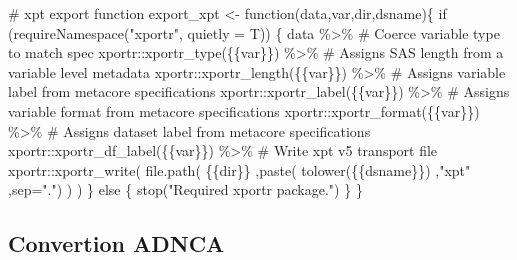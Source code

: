 \documentclass[
  letterpaper,
  DIV=11,
  numbers=noendperiod]{scrreprt}
\newenvironment{Shaded}{\begin{snugshade}}{\end{snugshade}}
\newcommand{\AttributeTok}[1]{\textcolor[rgb]{0.40,0.45,0.13}{#1}}
\newcommand{\CommentTok}[1]{\textcolor[rgb]{0.37,0.37,0.37}{#1}}
\newcommand{\ControlFlowTok}[1]{\textcolor[rgb]{0.00,0.23,0.31}{#1}}
\newcommand{\FunctionTok}[1]{\textcolor[rgb]{0.28,0.35,0.67}{#1}}
\newcommand{\NormalTok}[1]{\textcolor[rgb]{0.00,0.23,0.31}{#1}}
\newcommand{\OtherTok}[1]{\textcolor[rgb]{0.00,0.23,0.31}{#1}}
\newcommand{\SpecialCharTok}[1]{\textcolor[rgb]{0.37,0.37,0.37}{#1}}
\newcommand{\StringTok}[1]{\textcolor[rgb]{0.13,0.47,0.30}{#1}}
\begin{document}
\begin{Shaded}
\begin{Highlighting}[]
\CommentTok{\# xpt export function}
\NormalTok{export\_xpt }\OtherTok{\textless{}{-}} \ControlFlowTok{function}\NormalTok{(data,var,dir,dsname)\{}
  \ControlFlowTok{if}\NormalTok{ (}\FunctionTok{requireNamespace}\NormalTok{(}\StringTok{"xportr"}\NormalTok{, }\AttributeTok{quietly =}\NormalTok{ T)) \{}
\NormalTok{    data }\SpecialCharTok{\%\textgreater{}\%}
      \CommentTok{\# Coerce variable type to match spec}
\NormalTok{      xportr}\SpecialCharTok{::}\FunctionTok{xportr\_type}\NormalTok{(\{\{var\}\}) }\SpecialCharTok{\%\textgreater{}\%}
      \CommentTok{\# Assigns SAS length from a variable level metadata}
\NormalTok{      xportr}\SpecialCharTok{::}\FunctionTok{xportr\_length}\NormalTok{(\{\{var\}\}) }\SpecialCharTok{\%\textgreater{}\%}
      \CommentTok{\# Assigns variable label from metacore specifications}
\NormalTok{      xportr}\SpecialCharTok{::}\FunctionTok{xportr\_label}\NormalTok{(\{\{var\}\}) }\SpecialCharTok{\%\textgreater{}\%}
      \CommentTok{\# Assigns variable format from metacore specifications}
\NormalTok{      xportr}\SpecialCharTok{::}\FunctionTok{xportr\_format}\NormalTok{(\{\{var\}\}) }\SpecialCharTok{\%\textgreater{}\%}
      \CommentTok{\# Assigns dataset label from metacore specifications}
\NormalTok{      xportr}\SpecialCharTok{::}\FunctionTok{xportr\_df\_label}\NormalTok{(\{\{var\}\}) }\SpecialCharTok{\%\textgreater{}\%}
      \CommentTok{\# Write xpt v5 transport file}
\NormalTok{      xportr}\SpecialCharTok{::}\FunctionTok{xportr\_write}\NormalTok{(}
        \FunctionTok{file.path}\NormalTok{(}
\NormalTok{           \{\{dir\}\}}
\NormalTok{          ,}\FunctionTok{paste}\NormalTok{(}
             \FunctionTok{tolower}\NormalTok{(\{\{dsname\}\})}
\NormalTok{            ,}\StringTok{"xpt"}
\NormalTok{            ,}\AttributeTok{sep=}\StringTok{"."}\NormalTok{)}
\NormalTok{        )}
\NormalTok{      ) }
\NormalTok{  \}}
  \ControlFlowTok{else}\NormalTok{ \{}
    \FunctionTok{stop}\NormalTok{(}\StringTok{"Required \textquotesingle{}xportr\textquotesingle{} package."}\NormalTok{)}
\NormalTok{  \}}
\NormalTok{\}}
\end{Highlighting}
\end{Shaded}

\hypertarget{convertion-adnca}{%
\subsection{Convertion ADNCA}\label{convertion-adnca}}
\end{document}
